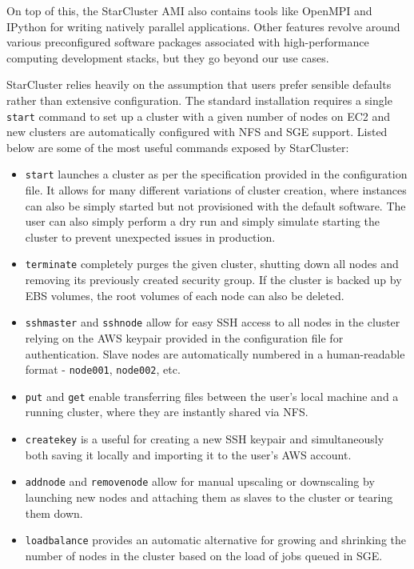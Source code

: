 On top of this, the StarCluster AMI also contains tools like OpenMPI \cite{OpenMPI} and IPython \cite{IPython} for writing natively parallel applications. Other features revolve around various preconfigured software packages associated with high-performance computing development stacks, but they go beyond our use cases.

StarCluster relies heavily on the assumption that users prefer sensible defaults rather than extensive configuration. The standard installation requires a single \verb|start| command to set up a cluster with a given number of nodes on EC2 and new clusters are automatically configured with NFS and SGE support. Listed below are some of the most useful commands exposed by StarCluster:
\begin{itemize}
	\item \verb|start| launches a cluster as per the specification provided in the configuration file. It allows for many different variations of cluster creation, where instances can also be simply started but not provisioned with the default software. The user can also simply perform a dry run and simply simulate starting the cluster to prevent unexpected issues in production.
	\item \verb|terminate| completely purges the given cluster, shutting down all nodes and removing its previously created security group. If the cluster is backed up by EBS volumes, the root volumes of each node can also be deleted.
	\item \verb|sshmaster| and \verb|sshnode| allow for easy SSH access to all nodes in the cluster relying on the AWS keypair provided in the configuration file for authentication. Slave nodes are automatically numbered in a human-readable format - \verb|node001|, \verb|node002|, etc.
	\item \verb|put| and \verb|get| enable transferring files between the user's local machine and a running cluster, where they are instantly shared via NFS.
	\item \verb|createkey| is a useful for creating a new SSH keypair and simultaneously both saving it locally and importing it to the user's AWS account.
	\item \verb|addnode| and \verb|removenode| allow for manual upscaling or downscaling by launching new nodes and attaching them as slaves to the cluster or tearing them down.
	\item \verb|loadbalance| provides an automatic alternative for growing and shrinking the number of nodes in the cluster based on the load of jobs queued in SGE.
\end{itemize}


